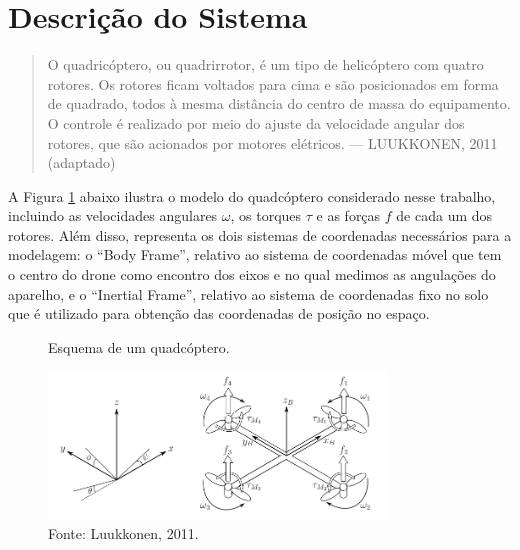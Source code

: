 \section{Descrição do Sistema}
\begin{quote}
    O quadricóptero, ou quadrirrotor, é um tipo de helicóptero com quatro rotores. Os rotores ficam 
    voltados para cima e são posicionados em forma de quadrado, todos à mesma distância do centro de 
    massa do equipamento. O controle é realizado por meio do ajuste da velocidade angular dos rotores, 
    que são acionados por motores elétricos. — LUUKKONEN, 2011 \cite{luukkonen} (adaptado)
\end{quote}

A Figura \ref{fig:modelo} abaixo ilustra o modelo do quadcóptero considerado nesse trabalho, incluindo 
as velocidades angulares $\omega$, os torques $\tau$ e as forças $f$ de cada um dos rotores. Além disso, 
representa os dois sistemas de coordenadas necessários para a modelagem: o ``Body Frame'', relativo ao 
sistema de coordenadas móvel que tem o centro do drone como encontro dos eixos e no qual medimos as angulações 
do aparelho, e o ``Inertial Frame'', relativo ao sistema de coordenadas fixo no solo que é utilizado para 
obtenção das coordenadas de posição no espaço.
\begin{figure}[h!]
    \centering
    \caption{Esquema de um quadcóptero.}
    \includegraphics[width=0.8\textwidth]{figs/desenho_drone.png}
    \caption*{\footnotesize{Fonte: Luukkonen, 2011. \cite{luukkonen}}}
    \label{fig:modelo}
\end{figure}

